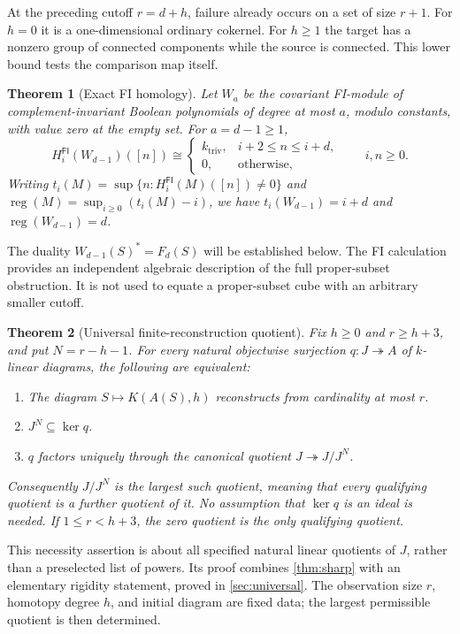 \documentclass[11pt,a4paper]{article}
\newtheorem{theorem}{Theorem}[section]
\theoremstyle{definition}
\theoremstyle{remark}
\newcommand{\FI}{\mathsf{FI}}
\begin{document}
At the preceding cutoff $r=d+h$, failure already occurs on a set of size $r+1$. For $h=0$ it is a one-dimensional ordinary cokernel. For $h\ge1$ the target has a nonzero group of connected components while the source is connected. This lower bound tests the comparison map itself.

\begin{theorem}[Exact FI homology]\label{thm:fi-intro}
Let $W_a$ be the covariant FI-module of complement-invariant Boolean polynomials of degree at most $a$, modulo constants, with value zero at the empty set. For $a=d-1\ge1$,
\[
 H_i^{\FI}(W_{d-1})([n])\cong
 \begin{cases}
 k_{\mathrm{triv}},&i+2\le n\le i+d,\\
 0,&\text{otherwise},
 \end{cases}\qquad i,n\ge0.
\]
Writing $t_i(M)=\sup\{n:H_i^{\FI}(M)([n])\ne0\}$ and
$\operatorname{reg}(M)=\sup_{i\ge0}(t_i(M)-i)$, we have
$t_i(W_{d-1})=i+d$ and $\operatorname{reg}(W_{d-1})=d$.
\end{theorem}

The duality $W_{d-1}(S)^*=F_d(S)$ will be established below. The FI calculation provides an independent algebraic description of the full proper-subset obstruction. It is not used to equate a proper-subset cube with an arbitrary smaller cutoff.

\begin{theorem}[Universal finite-reconstruction quotient]\label{thm:universal}
Fix $h\ge0$ and $r\ge h+3$, and put $N=r-h-1$. For every natural objectwise surjection $q:J\twoheadrightarrow A$ of $k$-linear diagrams, the following are equivalent:
\begin{enumerate}[label=\textup{(\roman*)}]
 \item The diagram $S\mapsto K(A(S),h)$ reconstructs from cardinality at most $r$.
 \item $J^N\subseteq\ker q$.
 \item $q$ factors uniquely through the canonical quotient $J\twoheadrightarrow J/J^N$.
\end{enumerate}
Consequently $J/J^N$ is the largest such quotient, meaning that every qualifying quotient is a further quotient of it. No assumption that $\ker q$ is an ideal is needed. If $1\le r<h+3$, the zero quotient is the only qualifying quotient.
\end{theorem}

This necessity assertion is about all specified natural linear quotients of $J$, rather than a preselected list of powers. Its proof combines \cref{thm:sharp} with an elementary rigidity statement, proved in \cref{sec:universal}. The observation size $r$, homotopy degree $h$, and initial diagram are fixed data; the largest permissible quotient is then determined.
\end{document}
